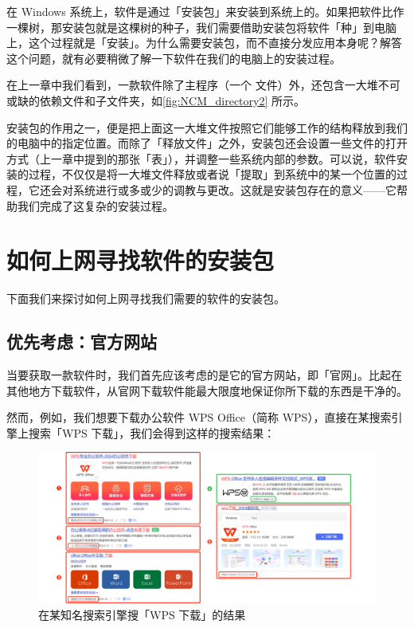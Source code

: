 在 Windows 系统上，软件是通过「安装包」来安装到系统上的。如果把软件比作一棵树，那安装包就是这棵树的种子，我们需要借助安装包将软件「种」到电脑上，这个过程就是「安装」。为什么需要安装包，而不直接分发应用本身呢？解答这个问题，就有必要稍微了解一下软件在我们的电脑上的安装过程。

在上一章中我们看到，一款软件除了主程序（一个  文件）外，还包含一大堆不可或缺的依赖文件和子文件夹，如\autoref{fig:NCM_directory2} 所示。

安装包的作用之一，便是把上面这一大堆文件按照它们能够工作的结构释放到我们的电脑中的指定位置。而除了「释放文件」之外，安装包还会设置一些文件的打开方式（上一章中提到的那张「表」），并调整一些系统内部的参数。可以说，软件安装的过程，不仅仅是将一大堆文件释放或者说「提取」到系统中的某一个位置的过程，它还会对系统进行或多或少的调教与更改。这就是安装包存在的意义——它帮助我们完成了这复杂的安装过程。

\section{如何上网寻找软件的安装包}

下面我们来探讨如何上网寻找我们需要的软件的安装包。

\subsection{优先考虑：官方网站}

当要获取一款软件时，我们首先应该考虑的是它的官方网站，即「官网」。比起在其他地方下载软件，从官网下载软件能最大限度地保证你所下载的东西是干净的。

然而，例如，我们想要下载办公软件 WPS Office（简称 WPS），直接在某搜索引擎上搜索「WPS 下载」，我们会得到这样的搜索结果：

\begin{figure}[htb!]
  \centering
  \includegraphics[width=.98\textwidth]{assets/basic/Ads_in_search_engine.pdf}
  \caption{在某知名搜索引擎搜「WPS 下载」的结果}
  \label{fig:Ads_in_search_engine}
\end{figure}

